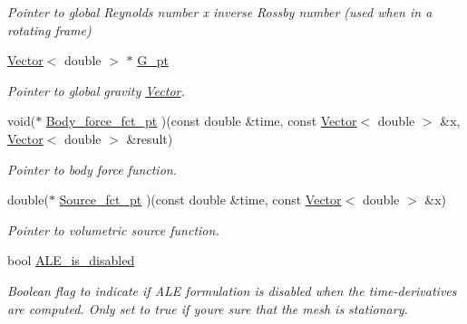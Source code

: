 \begin{DoxyCompactItemize}
\begin{DoxyCompactList}\small\item\em Pointer to global Reynolds number x inverse Rossby number (used when in a rotating frame) \end{DoxyCompactList}\item 
\hyperlink{classoomph_1_1Vector}{Vector}$<$ double $>$ $\ast$ \hyperlink{classoomph_1_1AxisymmetricNavierStokesEquations_a1a2ff96126d9077ab3da76ee81149b78}{G\+\_\+pt}
\begin{DoxyCompactList}\small\item\em Pointer to global gravity \hyperlink{classoomph_1_1Vector}{Vector}. \end{DoxyCompactList}\item 
void($\ast$ \hyperlink{classoomph_1_1AxisymmetricNavierStokesEquations_a83815184422697e10d9ebe3b13640704}{Body\+\_\+force\+\_\+fct\+\_\+pt} )(const double \&time, const \hyperlink{classoomph_1_1Vector}{Vector}$<$ double $>$ \&x, \hyperlink{classoomph_1_1Vector}{Vector}$<$ double $>$ \&result)
\begin{DoxyCompactList}\small\item\em Pointer to body force function. \end{DoxyCompactList}\item 
double($\ast$ \hyperlink{classoomph_1_1AxisymmetricNavierStokesEquations_a147fe7513792db73d175d5100808903c}{Source\+\_\+fct\+\_\+pt} )(const double \&time, const \hyperlink{classoomph_1_1Vector}{Vector}$<$ double $>$ \&x)
\begin{DoxyCompactList}\small\item\em Pointer to volumetric source function. \end{DoxyCompactList}\item 
bool \hyperlink{classoomph_1_1AxisymmetricNavierStokesEquations_a97f46e5472537187107d0454b6013b5f}{A\+L\+E\+\_\+is\+\_\+disabled}
\begin{DoxyCompactList}\small\item\em Boolean flag to indicate if A\+LE formulation is disabled when the time-\/derivatives are computed. Only set to true if you\textquotesingle{}re sure that the mesh is stationary. \end{DoxyCompactList}\end{DoxyCompactItemize}
